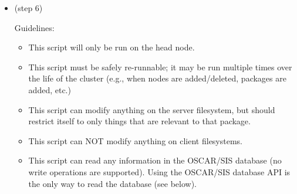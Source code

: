 \begin{itemize}
  \begin{itemize}
  \item This script will be run on the client filesystem.  That is, it
    will either be chrooted to the image or run on all of the actual
    nodes themselves.
  \item This use of this API script is strongly discouraged.  The
    contents of this script should normally be contained in the \%post
    scripts in the RPMs themselves.  This API script is only here to
    help taking third party non-OSCAR-ized RPMs and graft them into
    the OSCAR framework without needing to re-make the RPM.
  \item This script must be safely re-runnable; it may be run multiple
    times over the life of the cluster.
  \item This script can modify anything on the client filesystem, but
    should restrict itself to only things that are relevant to that
    package.
  \item This script cannot use anything from the OSCAR/SIS database
    \footnote{This may change in future versions of the API, but for
      now, nothing in the OSCAR/SIS DB is available during this step.}
    The only piece of global information that is available is the
    hostname oscar\_server, which will be set correctly in the
    /etc/hosts on every node/image.
  \end{itemize}

  Parameters:

  \begin{itemize}
  \item None.
  \end{itemize}

\item {} (step 6)

  Guidelines:

  \begin{itemize}
  \item This script will only be run on the head node.
  \item This script must be safely re-runnable; it may be run multiple
    times over the life of the cluster (e.g., when nodes are
    added/deleted, packages are added, etc.)
  \item This script can modify anything on the server filesystem, but
    should restrict itself to only things that are relevant to that
    package.
  \item This script can NOT modify anything on client filesystems.
  \item This script can read any information in the OSCAR/SIS database
    (no write operations are supported).  Using the OSCAR/SIS database
    API is the only way to read the database (see below).
  \end{itemize}


\end{itemize}
